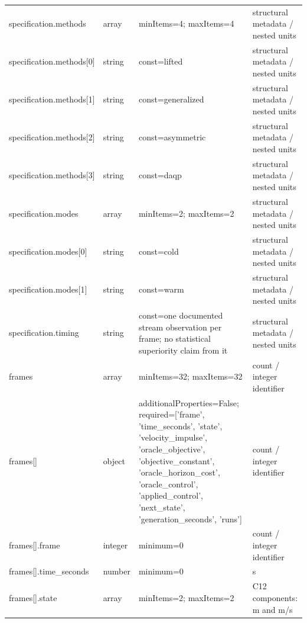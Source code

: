 \begin{longtable}{@{}>{\raggedright\arraybackslash}p{}>{\raggedright\arraybackslash}p{}>{\raggedright\arraybackslash}p{}>{\raggedright\arraybackslash}p{}@{}}
specification.\allowbreak{}methods & array & minItems=\allowbreak{}4; maxItems=\allowbreak{}4 & structural metadata /\allowbreak{} nested units\\
specification.\allowbreak{}methods[0] & string & const=\allowbreak{}lifted & structural metadata /\allowbreak{} nested units\\
specification.\allowbreak{}methods[1] & string & const=\allowbreak{}generalized & structural metadata /\allowbreak{} nested units\\
specification.\allowbreak{}methods[2] & string & const=\allowbreak{}asymmetric & structural metadata /\allowbreak{} nested units\\
specification.\allowbreak{}methods[3] & string & const=\allowbreak{}daqp & structural metadata /\allowbreak{} nested units\\
specification.\allowbreak{}modes & array & minItems=\allowbreak{}2; maxItems=\allowbreak{}2 & structural metadata /\allowbreak{} nested units\\
specification.\allowbreak{}modes[0] & string & const=\allowbreak{}cold & structural metadata /\allowbreak{} nested units\\
specification.\allowbreak{}modes[1] & string & const=\allowbreak{}warm & structural metadata /\allowbreak{} nested units\\
specification.\allowbreak{}timing & string & const=\allowbreak{}one documented stream observation per frame; no statistical superiority claim from it & structural metadata /\allowbreak{} nested units\\
frames & array & minItems=\allowbreak{}32; maxItems=\allowbreak{}32 & count /\allowbreak{} integer identifier\\
frames[] & object & additionalProperties=\allowbreak{}False; required=\allowbreak{}['frame', 'time\_\allowbreak{}seconds', 'state', 'velocity\_\allowbreak{}impulse', 'oracle\_\allowbreak{}objective', 'objective\_\allowbreak{}constant', 'oracle\_\allowbreak{}horizon\_\allowbreak{}cost', 'oracle\_\allowbreak{}control', 'applied\_\allowbreak{}control', 'next\_\allowbreak{}state', 'generation\_\allowbreak{}seconds', 'runs'] & count /\allowbreak{} integer identifier\\
frames[].\allowbreak{}frame & integer & minimum=\allowbreak{}0 & count /\allowbreak{} integer identifier\\
frames[].\allowbreak{}time\_\allowbreak{}seconds & number & minimum=\allowbreak{}0 & s\\
frames[].\allowbreak{}state & array & minItems=\allowbreak{}2; maxItems=\allowbreak{}2 & C12 components: m and m/\allowbreak{}s\\

\end{longtable}

